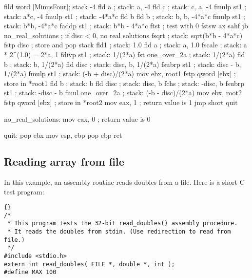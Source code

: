 {\begin{AsmCodeListing}[label=quad.asm,commentchar=$]
        fild    word [MinusFour]; stack -4
        fld     a               ; stack: a, -4
        fld     c               ; stack: c, a, -4
        fmulp   st1             ; stack: a*c, -4
        fmulp   st1             ; stack: -4*a*c
        fld     b
        fld     b               ; stack: b, b, -4*a*c
        fmulp   st1             ; stack: b*b, -4*a*c
        faddp   st1             ; stack: b*b - 4*a*c
        ftst                    ; test with 0
        fstsw   ax
        sahf
        jb      no_real_solutions ; if disc < 0, no real solutions
        fsqrt                   ; stack: sqrt(b*b - 4*a*c)
        fstp    disc            ; store and pop stack
        fld1                    ; stack: 1.0
        fld     a               ; stack: a, 1.0
        fscale                  ; stack: a * 2^(1.0) = 2*a, 1
        fdivp   st1             ; stack: 1/(2*a)
        fst     one_over_2a     ; stack: 1/(2*a)
        fld     b               ; stack: b, 1/(2*a)
        fld     disc            ; stack: disc, b, 1/(2*a)
        fsubrp  st1             ; stack: disc - b, 1/(2*a)
        fmulp   st1             ; stack: (-b + disc)/(2*a)
        mov     ebx, root1
        fstp    qword [ebx]     ; store in *root1
        fld     b               ; stack: b
        fld     disc            ; stack: disc, b
        fchs                    ; stack: -disc, b
        fsubrp  st1             ; stack: -disc - b
        fmul    one_over_2a     ; stack: (-b - disc)/(2*a)
        mov     ebx, root2
        fstp    qword [ebx]     ; store in *root2
        mov     eax, 1          ; return value is 1
        jmp     short quit

no_real_solutions:
        mov     eax, 0          ; return value is 0

quit:
        pop     ebx
        mov     esp, ebp
        pop     ebp
        ret
\end{AsmCodeListing}

\subsection{Reading array from file}

In this example, an assembly routine reads doubles from a file. Here is
a short C test program:
\begin{lstlisting}{}
/*
 * This program tests the 32-bit read_doubles() assembly procedure.
 * It reads the doubles from stdin. (Use redirection to read from file.)
 */
#include <stdio.h>
extern int read_doubles( FILE *, double *, int );
#define MAX 100


\end{lstlisting}}
